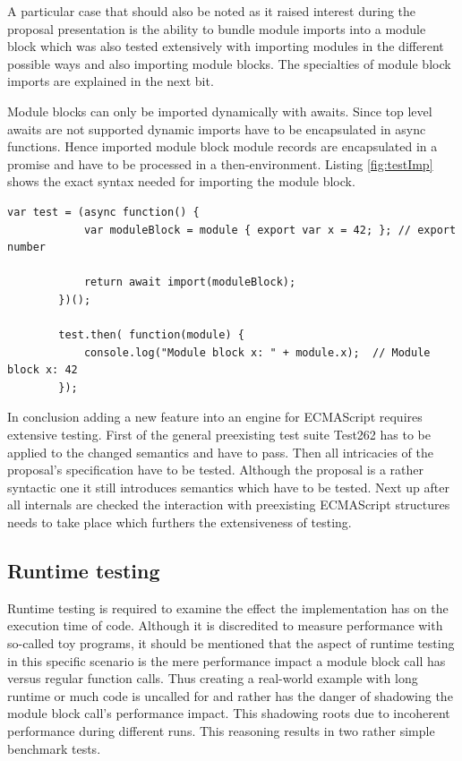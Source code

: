 A particular case that should also be noted as it raised interest during the proposal presentation is the ability to bundle module imports into a module block which was also tested extensively with importing modules in the different possible ways and also importing module blocks. The specialties of module block imports are explained in the next bit.

Module blocks can only be imported dynamically with awaits. Since top level awaits are not supported dynamic imports have to be encapsulated in async functions. Hence imported module block module records are encapsulated in a promise and have to be processed in a then-environment. Listing \ref{fig:testImp} shows the exact syntax needed for importing the module block.

    \begin{lstlisting}[caption={Module block dynamic import test}, label={fig:testImp}]
        var test = (async function() {
            var moduleBlock = module { export var x = 42; }; // export number
            
            return await import(moduleBlock);
        })();
        
        test.then( function(module) {
            console.log("Module block x: " + module.x);  // Module block x: 42
        });
    \end{lstlisting}

In conclusion adding a new feature into an engine for ECMAScript requires extensive testing. First of the general preexisting test suite Test262 has to be applied to the changed semantics and have to pass. Then all intricacies of the proposal's specification have to be tested. Although the proposal is a rather syntactic one it still introduces semantics which have to be tested. Next up after all internals are checked the interaction with preexisting ECMAScript structures needs to take place which furthers the extensiveness of testing.

\subsection{Runtime testing}

Runtime testing is required to examine the effect the implementation has on the execution time of code.  Although it is discredited to measure performance with so-called toy programs, it should be mentioned that the aspect of runtime testing in this specific scenario is the mere performance impact a module block call has versus regular function calls. \cite{HennessyJohnL2007Ca:a} Thus creating a real-world example with long runtime or much code is uncalled for and rather has the danger of shadowing the module block call's performance impact. This shadowing roots 
due to incoherent performance during different runs. This reasoning results in two rather simple benchmark tests.


